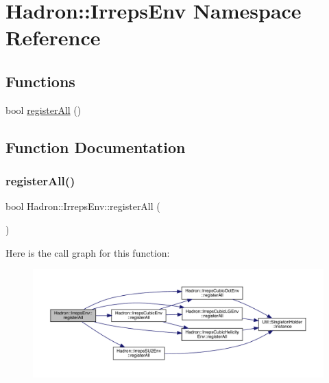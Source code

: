 \hypertarget{namespaceHadron_1_1IrrepsEnv}{}\section{Hadron\+:\+:Irreps\+Env Namespace Reference}
\label{namespaceHadron_1_1IrrepsEnv}
\subsection*{Functions}
\begin{DoxyCompactItemize}
\item 
bool \mbox{\hyperlink{namespaceHadron_1_1IrrepsEnv_a17654fb199d3c0da80c640ff7e8c6c10}{register\+All}} ()
\end{DoxyCompactItemize}


\subsection{Function Documentation}
\mbox{\label{namespaceHadron_1_1IrrepsEnv_a17654fb199d3c0da80c640ff7e8c6c10}} 
\subsubsection{\texorpdfstring{registerAll()}{registerAll()}}
{\footnotesize\ttfamily bool Hadron\+::\+Irreps\+Env\+::register\+All (\begin{DoxyParamCaption}{ }\end{DoxyParamCaption})}

Here is the call graph for this function\+:\nopagebreak
\begin{figure}[H]
\begin{center}
\leavevmode
\includegraphics[width=350pt]{d5/d5b/namespaceHadron_1_1IrrepsEnv_a17654fb199d3c0da80c640ff7e8c6c10_cgraph}
\end{center}
\end{figure}
